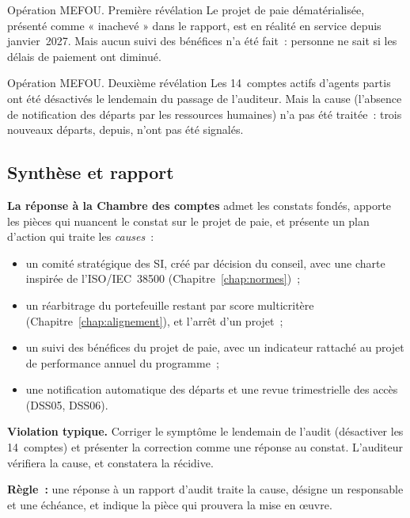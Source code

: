 \begin{boxscenario}{Opération MEFOU. Première révélation}
Le projet de paie dématérialisée, présenté comme « inachevé » dans le
rapport, est en réalité en service depuis janvier~2027. Mais aucun suivi
des bénéfices n'a été fait~: personne ne sait si les délais de paiement
ont diminué.
\end{boxscenario}

\begin{boxscenario}{Opération MEFOU. Deuxième révélation}
Les 14~comptes actifs d'agents partis ont été désactivés le lendemain du
passage de l'auditeur. Mais la cause (l'absence de notification des
départs par les ressources humaines) n'a pas été traitée~: trois nouveaux
départs, depuis, n'ont pas été signalés.
\end{boxscenario}

\subsection{Synthèse et rapport}

\textbf{La réponse à la Chambre des comptes} admet les constats fondés,
apporte les pièces qui nuancent le constat sur le projet de paie, et
présente un plan d'action qui traite les \emph{causes}~:
\begin{itemize}
    \item un comité stratégique des SI, créé par décision du conseil, avec
          une charte inspirée de l'ISO/IEC~38500 (Chapitre~\ref{chap:normes})~;
    \item un réarbitrage du portefeuille restant par score multicritère
          (Chapitre~\ref{chap:alignement}), et l'arrêt d'un projet~;
    \item un suivi des bénéfices du projet de paie, avec un indicateur
          rattaché au projet de performance annuel du programme~;
    \item une notification automatique des départs et une revue trimestrielle
          des accès (DSS05, DSS06).
\end{itemize}

\begin{boxalert}
\textbf{Violation typique.} Corriger le symptôme le lendemain de l'audit
(désactiver les 14~comptes) et présenter la correction comme une réponse
au constat. L'auditeur vérifiera la cause, et constatera la récidive.

\smallskip
\textbf{Règle~:} une réponse à un rapport d'audit traite la cause, désigne
un responsable et une échéance, et indique la pièce qui prouvera la mise
en œuvre.
\end{boxalert}


